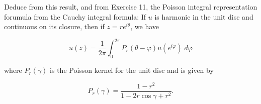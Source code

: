 Deduce from this result, and from Exercise 11, the Poisson integral representation forumula from the Cauchy integral 
formula: If $u$ is harmonic in the unit disc and continuous on its closure, then if $z = re^{i \theta}$, we have

$$
u(z) = \frac{1}{2 \pi} \int_{0}^{2 \pi} P_r (\theta - \varphi) u(e^{i \varphi}) \; d\varphi
$$

where $P_r(\gamma)$ is the Poisson kernel for the unit disc and is given by

$$
P_r(\gamma) = \frac{1 - r^2}{1 - 2r \cos \gamma + r^2}.
$$